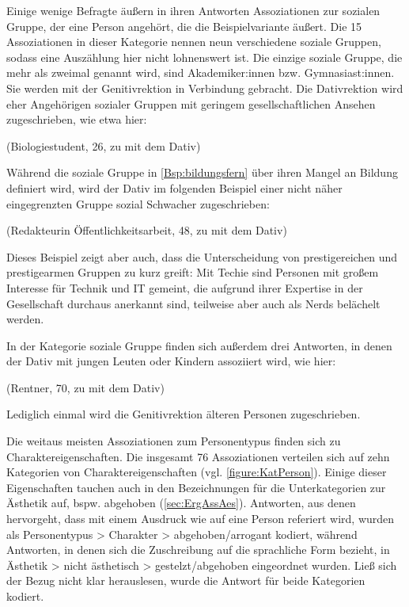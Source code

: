 Einige wenige Befragte äußern in ihren Antworten Assoziationen zur sozialen Gruppe, der eine Person angehört, die die Beispielvariante äußert. 
Die 15 Assoziationen in dieser Kategorie nennen neun verschiedene soziale Gruppen, sodass eine Auszählung hier nicht lohnenswert ist. 
Die einzige soziale Gruppe, die mehr als zweimal genannt wird, sind Akademiker:innen bzw. Gymnasiast:innen.
Sie werden mit der Genitivrektion in Verbindung gebracht.
Die Dativrektion wird eher Angehörigen sozialer Gruppen mit geringem gesellschaftlichen Ansehen zugeschrieben, wie etwa hier: 
\begin{exe}
\ex {} (Biologiestudent, 26, zu \waehrend{} mit dem Dativ) \label{Bsp:bildungsfern}
\end{exe}
Während die soziale Gruppe in \autoref{Bsp:bildungsfern} über ihren Mangel an Bildung definiert wird, wird der Dativ im folgenden Beispiel einer nicht näher eingegrenzten Gruppe \glqq sozial Schwacher\grqq{} zugeschrieben: 
\begin{exe}
\ex {} (Redakteurin Öffentlichkeitsarbeit, 48, zu \waehrend{} mit dem Dativ)
\end{exe}
Dieses Beispiel zeigt aber auch, dass die Unterscheidung von prestigereichen und prestigearmen Gruppen zu kurz greift: 
Mit \glqq Techie\grqq{} sind Personen mit großem Interesse für Technik und IT gemeint, die aufgrund ihrer Expertise in der Gesellschaft durchaus anerkannt sind, teilweise aber auch als \glqq Nerds\grqq{} belächelt werden. 

In der Kategorie \glqq soziale Gruppe\grqq{} finden sich außerdem drei Antworten, in denen der Dativ mit jungen Leuten oder Kindern assoziiert wird, wie hier: 
\begin{exe}
\ex {} (Rentner, 70, zu \waehrend{} mit dem Dativ)
\end{exe}
Lediglich einmal wird die Genitivrektion älteren Personen zugeschrieben. 

Die weitaus meisten Assoziationen zum Personentypus finden sich zu Charaktereigenschaften.
Die insgesamt 76 Assoziationen verteilen sich auf zehn Kategorien von Charaktereigenschaften (vgl. \autoref{figure:KatPerson}). 
Einige dieser Eigenschaften tauchen auch in den Bezeichnungen für die Unterkategorien zur Ästhetik auf, bspw. abgehoben (\autoref{sec:ErgAssAes}). 
Antworten, aus denen hervorgeht, dass mit einem Ausdruck wie  auf eine Person referiert wird, wurden als \glqq Personentypus > Charakter > abgehoben/arrogant\grqq{} kodiert, während Antworten, in denen sich die Zuschreibung auf die sprachliche Form bezieht, in \glqq Ästhetik > nicht ästhetisch > gestelzt/abgehoben\grqq{} eingeordnet wurden. 
Ließ sich der Bezug nicht klar herauslesen, wurde die Antwort für beide Kategorien kodiert. 

